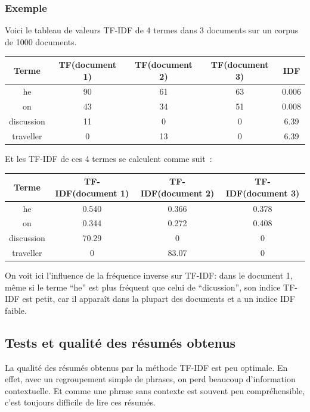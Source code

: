 \documentclass[a4paper, 12pt]{article}
\begin{document}
\subsubsection{Exemple}
Voici le tableau de valeurs TF-IDF de 4 termes dans 3 documents sur un corpus de 1000 documents.
\begin{center}
	\begin{tabular}{|c|c|c|c|c|}
	 \hline
	 	Terme & TF(document 1) & TF(document 2) & TF(document 3) & IDF \\
	 \hline
	 	he & 90 & 61 & 63 & 0.006 \\
	 \hline
	 	on & 43 & 34 & 51 & 0.008 \\
	 \hline
	 	discussion & 11 & 0 & 0 & 6.39 \\
	 \hline
	 	traveller & 0 & 13 & 0 & 6.39 \\
	 \hline
	\end{tabular}
\end{center}

Et les TF-IDF de ces 4 termes se calculent comme suit~:

\begin{center}
	\begin{tabular}{|c|c|c|c|}
	 \hline
	 	Terme & TF-IDF(document 1) & TF-IDF(document 2) & TF-IDF(document 3) \\
	 \hline
	 	he & 0.540 & 0.366 & 0.378 \\
	 \hline
	 	on & 0.344 & 0.272 & 0.408 \\
	 \hline
	 	discussion & 70.29 & 0 & 0 \\
	 \hline
	 	traveller & 0 & 83.07 & 0 \\
	 \hline
	\end{tabular}
\end{center}

On voit ici l'influence de la fréquence inverse sur TF-IDF: dans le document 1, même si le terme ``he'' est plus fréquent que celui de ``dicussion'', son indice TF-IDF est petit, car il apparaît dans la plupart des documents et a un indice IDF faible.

\subsection{Tests et qualité des résumés obtenus}

La qualité des résumés obtenus par la méthode TF-IDF est peu optimale. En effet, avec un regroupement simple de phrases, on perd beaucoup d'information contextuelle. Et comme une phrase sans contexte est souvent peu compréhensible, c'est toujours difficile de lire ces résumés.
\end{document}

